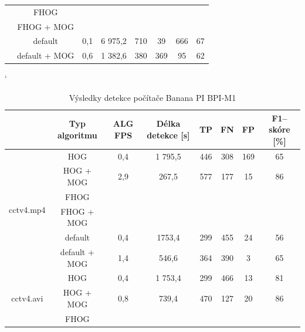 \begin{table}[H]
\begin{tabular}{|c|c|c|c|c|c|c|c|}
                         & FHOG       		&         &               	  &    		&    	&    	& 		        \\ \cline{2-8} 
                         & FHOG + MOG 		&         &               	  &    		&    	&    	& 		        \\ \cline{2-8} 
                         & default	 		&   0,1   &   6 975,2        	  &   710 	& 39   	& 666    	& 	67	        \\ \cline{2-8} 
                         & default + MOG 	&   0,6   &   1 382,6        	  &   380		& 369   	& 95   	&    62	        \\ \hline
\end{tabular}
\end{table}


\begin{table}[H]
\catcode`
\centering
\caption{Výsledky detekce počítače Banana PI BPI-M1}
\label{resultTabBPI}
\begin{tabular}{|c|c|c|c|c|c|c|c|}
\hline
                         & Typ algoritmu	& ALG FPS & Délka detekce [s] & TP 	  & FN 	& FP 	& F1--skóre [\%] \\ \hline
\multirow{6}{*}{cctv4.mp4} & HOG      		&  0,4    &   1 795,5    	  & 446     & 308 & 169  	&   65     	 	  \\ \cline{2-8} 
                         & HOG + MOG  		&  2,9    &     267,5     	  & 577     & 177 & 15  	     &   86     		  \\ \cline{2-8} 
                         & FHOG       		&         &               	  &    &    &    &          \\ \cline{2-8} 
                         & FHOG + MOG 		&         &               	  &    &    &    &          \\ \cline{2-8}  
                         & default	 		&  0,4    &    1753,4           & 299     & 455 & 24     &   56                \\ \cline{2-8}  
                         & default + MOG 	&  1,4    &     546,6           & 364     & 390 & 3      &   65                \\ \hline\hline 
\multirow{6}{*}{cctv4.avi} & HOG        	&  0,4    &   1 753,4     	  & 299	  & 466 & 13   &   81     		       \\ \cline{2-8} 
                         & HOG + MOG  		&  0,8    &     739,4      	  & 470     & 127 & 20   &   86                  \\ \cline{2-8} 
                         & FHOG       		&         &               	  &    &    &    &          \\ \cline{2-8} 

\end{tabular}
\end{table}
